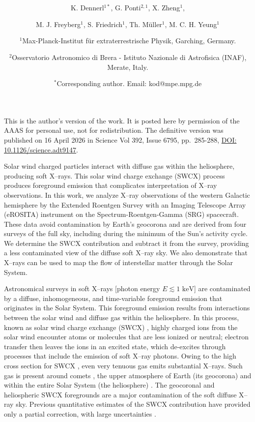 \documentclass[12pt]{article}
\date{}
\title{\bfseries \boldmath \scititle}
\author{

	K. Dennerl$^{1\ast}$,
	G. Ponti$^{2,1}$,
	X. Zheng$^1$,\and
	M. J. Freyberg$^1$,
	S. Friedrich$^1$,
	Th. M{\"u}ller$^1$,
	M. C. H. Yeung$^1$\and



  \small$^{1}$Max-Planck-Institut f\"ur extraterrestrische Physik, Garching, Germany.\and
  \small$^{2}$Osservatorio Astronomico di Brera - Istituto Nazionale di Astrofisica (INAF), Merate, Italy.\and

	\small$^\ast$Corresponding author. Email: kod@mpe.mpg.de
}
\renewenvironment{abstract}
	{\quotation}
	{\endquotation}
\begin{document}
\maketitle

\vspace*{-5mm}\noindent
\centerline{\vbox{\textwidth\noindent
This is the author's version of the work. It is posted here by permission of the AAAS for personal use, not for redistribution. The definitive version was published on 16 April 2026 in Science Vol 392, Issue 6795, pp.~285-288, \href{https://www.science.org/doi/10.1126/science.adt9147}{DOI: 10.1126/science.adt9147}.
}}






\begin{abstract} \bfseries \boldmath

Solar wind charged particles interact with diffuse gas within the heliosphere, producing soft X--rays. This solar wind charge exchange (SWCX) process produces foreground emission that complicates interpretation of X--ray observations. In this work, we analyze X--ray observations of the western Galactic hemisphere by the Extended Roentgen Survey with an Imaging Telescope Array (eROSITA) instrument on the Spectrum-Roentgen-Gamma (SRG) spacecraft. These data avoid contamination by Earth's geocorona and are derived from four surveys of the full sky, including during the minimum of the Sun's activity cycle. We determine the SWCX contribution and subtract it from the survey, providing a less contaminated view of the diffuse soft X--ray sky. We also demonstrate that X--rays can be used to map the flow of interstellar matter through the Solar System.

\end{abstract}



\noindent
Astronomical surveys in soft X--rays [photon energy $E\lesssim 1\mbox{ keV}$] \cite{sno97a,zhe24a} are contaminated by a diffuse, inhomogeneous, and time-variable foreground emission that originates in the Solar System. This foreground emission results from interactions between the solar wind and diffuse gas within the heliosphere. In this process, known as solar wind charge exchange (SWCX) \cite{cra97a}, highly charged ions from the solar wind encounter atoms or molecules that are less ionized or neutral; electron transfer then leaves the ions in an excited state, which de-excites through processes that include the emission of soft X--ray photons. Owing to the high cross section for SWCX \cite{cra97a}, even very tenuous gas emits substantial X--rays. Such gas is present around comets \cite{lis96d}, the upper atmosphere of Earth (its geocorona) \cite{kam17a} and within the entire Solar System (the heliosphere) \cite{que14a}. The geocoronal and heliospheric SWCX foregrounds \cite{den97a,cox98a,fre98a} are a major contamination of the soft diffuse X--ray sky. Previous quantitative estimates of the SWCX contribution have provided only a partial correction, with large uncertainties \cite{cra00a,wel09b,upr16a,sib18a,kun19a}.
\end{document}

